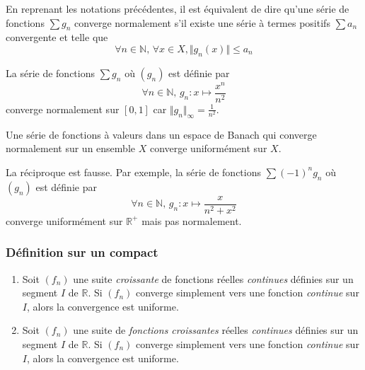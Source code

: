   \begin{remark}
    En reprenant les notations précédentes, il est équivalent de dire qu'une série de fonctions $\sum g_n$ converge normalement s'il existe une série à termes positifs $\sum a_n$ convergente et telle que
    \[ \forall n \in \mathbb{N}, \, \forall x \in X, \Vert g_n(x) \Vert \leq a_n \]
  \end{remark}

  \begin{example}
    La série de fonctions $\sum g_n$ où $(g_n)$ est définie par
    \[ \forall n \in \mathbb{N}, \, g_n : x \mapsto \frac{x^n}{n^2} \]
    converge normalement sur $[0,1]$ car $\Vert g_n \Vert_\infty = \frac{1}{n^2}$.
  \end{example}

  \begin{theorem}
    Une série de fonctions à valeurs dans un espace de Banach qui converge normalement sur un ensemble $X$ converge uniformément sur $X$.
  \end{theorem}

  \begin{cexample}
    La réciproque est fausse. Par exemple, la série de fonctions $\sum (-1)^n g_n$ où $(g_n)$ est définie par
    \[ \forall n \in \mathbb{N}, \, g_n : x \mapsto \frac{x}{n^2 + x^2} \]
    converge uniformément sur $\mathbb{R}^+$ mais pas normalement.
  \end{cexample}

  \subsubsection{Définition sur un compact}


  \begin{theorem}
    \begin{enumerate}[label=(\roman*)]
      \item Soit $(f_n)$ une suite \textit{croissante} de fonctions réelles \textit{continues} définies sur un segment $I$ de $\mathbb{R}$. Si $(f_n)$ converge simplement vers une fonction \textit{continue} sur $I$, alors la convergence est uniforme.
      \item Soit $(f_n)$ une suite de \textit{fonctions croissantes} réelles \textit{continues} définies sur un segment $I$ de $\mathbb{R}$. Si $(f_n)$ converge simplement vers une fonction \textit{continue} sur $I$, alors la convergence est uniforme.
    \end{enumerate}
  \end{theorem}

